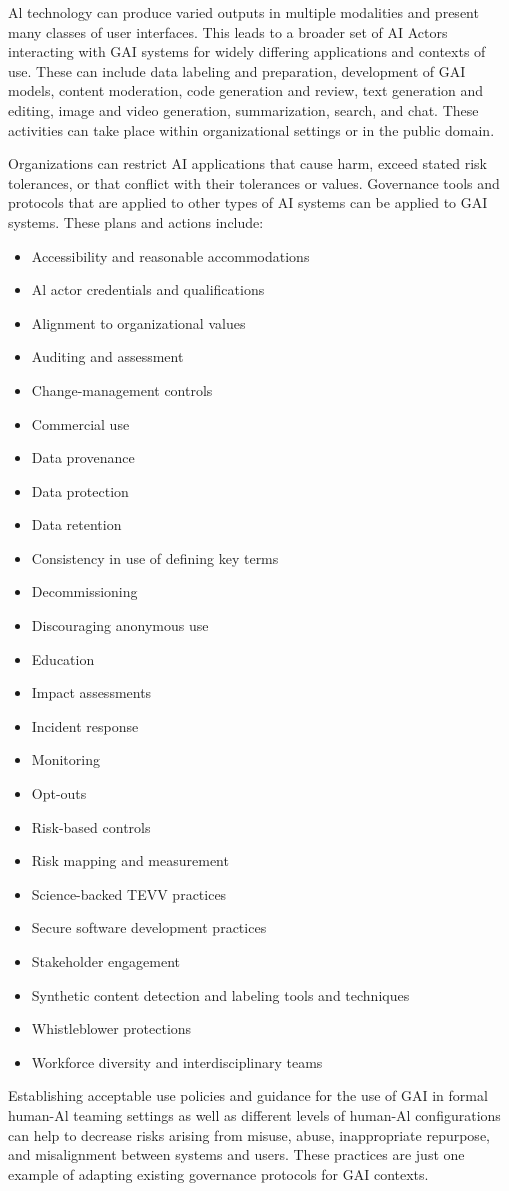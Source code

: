 \documentclass[10pt]{article}
\begin{document}
Al technology can produce varied outputs in multiple modalities and present many classes of user interfaces. This leads to a broader set of AI Actors interacting with GAI systems for widely differing applications and contexts of use. These can include data labeling and preparation, development of GAI models, content moderation, code generation and review, text generation and editing, image and video generation, summarization, search, and chat. These activities can take place within organizational settings or in the public domain.

Organizations can restrict AI applications that cause harm, exceed stated risk tolerances, or that conflict with their tolerances or values. Governance tools and protocols that are applied to other types of AI systems can be applied to GAI systems. These plans and actions include:
\begin{itemize}
  \item Accessibility and reasonable accommodations
  \item Al actor credentials and qualifications
  \item Alignment to organizational values
  \item Auditing and assessment
  \item Change-management controls
  \item Commercial use
  \item Data provenance
  \item Data protection
  \item Data retention
  \item Consistency in use of defining key terms
  \item Decommissioning
  \item Discouraging anonymous use
  \item Education
  \item Impact assessments
  \item Incident response
  \item Monitoring
  \item Opt-outs
  \item Risk-based controls
  \item Risk mapping and measurement
  \item Science-backed TEVV practices
  \item Secure software development practices
  \item Stakeholder engagement
  \item Synthetic content detection and labeling tools and techniques
  \item Whistleblower protections
  \item Workforce diversity and interdisciplinary teams
\end{itemize}
Establishing acceptable use policies and guidance for the use of GAI in formal human-Al teaming settings as well as different levels of human-Al configurations can help to decrease risks arising from misuse, abuse, inappropriate repurpose, and misalignment between systems and users. These practices are just one example of adapting existing governance protocols for GAI contexts.
\end{document}
